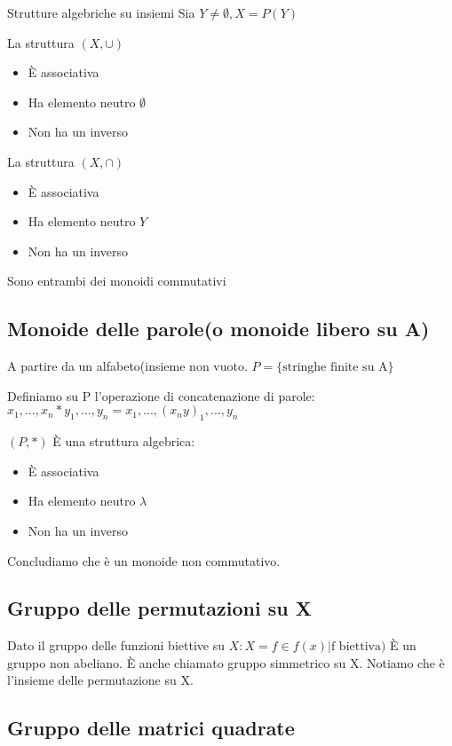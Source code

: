 \documentclass[a4paper, 10pt]{article}
\begin{document}
Strutture algebriche su insiemi
Sia $ Y \neq \emptyset, X=P(Y)$

La struttura $(X, \cup)$
\begin{itemize}
	\item È associativa
	\item Ha elemento neutro $\emptyset$
	\item Non ha un inverso
\end{itemize}

La struttura $(X, \cap)$
\begin{itemize}
	\item È associativa
	\item Ha elemento neutro $Y$
	\item Non ha un inverso
\end{itemize}

Sono entrambi dei monoidi commutativi


\subsection{Monoide delle parole(o monoide libero su A)}

A partire da un alfabeto(insieme non vuoto. $P=\{\text{stringhe finite su A}\}$
	
Definiamo su P l’operazione di concatenazione di parole: $x_1,...,x_n*y_1,...,y_n=x_1,...,(x_ny)_1,...,y_n$


$(P,*)$ È una struttura algebrica:

\begin{itemize}
	\item È associativa
	\item Ha elemento neutro $\lambda$
	\item Non ha un inverso
\end{itemize}

Concludiamo che è un monoide non commutativo.


\subsection{Gruppo delle permutazioni su X}

Dato il gruppo delle funzioni biettive su $X: X={f \in f(x) | \text{f biettiva}})$
È un gruppo non abeliano. È anche chiamato gruppo simmetrico su X. Notiamo che è l’insieme delle permutazione su X.

\subsection{Gruppo delle matrici quadrate}
\end{document}
